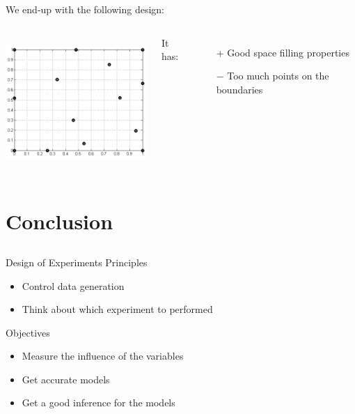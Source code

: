 \documentclass{beamer}
\begin{document}
\begin{frame}{}
We end-up with the following design:
\begin{columns}[c]
\column{6cm}
\begin{center}
\includegraphics[height=5cm]{figures/adaptativefinal}
\end{center}
\column{5cm}
It has:
\begin{itemize}
	\item[+] Good space filling properties
	\item[$-$] Too much points on the boundaries
\end{itemize}
\end{columns}
\end{frame}

\section[Concl.]{Conclusion}
\subsection{}

\begin{frame}{}
\begin{block}{Design of Experiments Principles}
	\begin{itemize}
		\item Control data generation
		\item Think about which experiment to performed
	\end{itemize}
\end{block}
\vspace{3mm}
\begin{block}{Objectives}
	\begin{itemize}
		\item Measure the influence of the variables
		\item Get accurate models
		\item Get a good inference for the models
	\end{itemize}
\end{block}
\end{frame}
\end{document}
